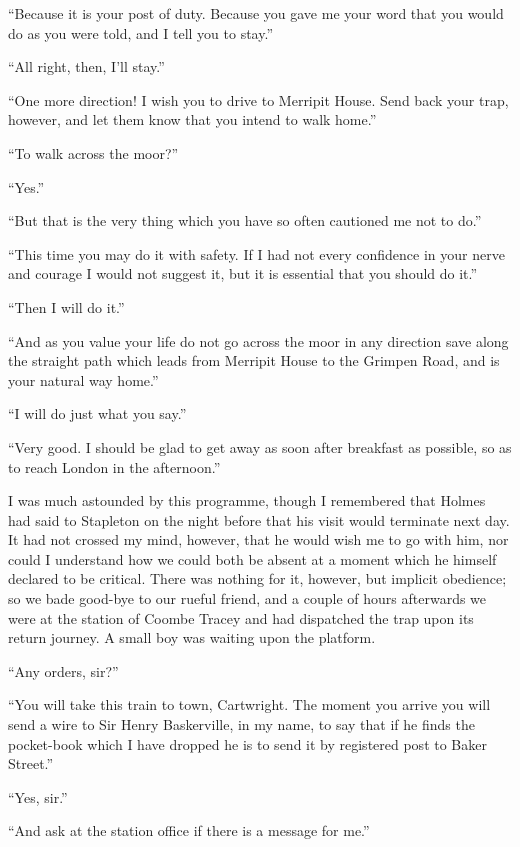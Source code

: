 \documentclass[paper=a5,BCOR=7mm,twoside,DIV=calc,12pt,usegeometry,openany,chapterprefix,endperiod,headings=big]{scrbook} %
\begin{document}
\enquote{Because it is your post of duty. Because you gave me your word that you would do as you were told, and I tell you to stay.}

\enquote{All right, then, I'll stay.}

\enquote{One more direction! I wish you to drive to Merripit House. Send back your trap, however, and let them know that you intend to walk home.}

\enquote{To walk across the moor?}

\enquote{Yes.}

\enquote{But that is the very thing which you have so often cautioned me not to do.}

\enquote{This time you may do it with safety. If I had not every confidence in your nerve and courage I would not suggest it, but it is essential that you should do it.}

\enquote{Then I will do it.}

\enquote{And as you value your life do not go across the moor in any direction save along the straight path which leads from Merripit House to the Grimpen Road, and is your natural way home.}

\enquote{I will do just what you say.}

\enquote{Very good. I should be glad to get away as soon after breakfast as possible, so as to reach London in the afternoon.}

I was much astounded by this programme, though I re\-mem\-bered that Holmes had said to Stapleton on the night before that his visit would terminate next day. It had not crossed my mind, however, that he would wish me to go with him, nor could I understand how we could both be absent at a moment which he himself declared to be critical. There was nothing for it, however, but implicit obedience; so we bade good-bye to our rueful friend, and a couple of hours afterwards we were at the station of Coombe Tracey and had dispatched the trap upon its return journey. A small boy was waiting upon the platform.

\enquote{Any orders, sir?}

\enquote{You will take this train to town, Cartwright. The moment you arrive you will send a wire to Sir Henry Baskerville, in my name, to say that if he finds the pocket-book which I have dropped he is to send it by registered post to Baker Street.}

\enquote{Yes, sir.}

\enquote{And ask at the station office if there is a message for me.}
\end{document}
